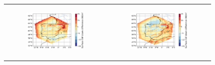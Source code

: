 \begin{figure}[htbp]
\begin{tabular}{cc}
        \begin{subfigure}[b]{0.33\textwidth}
            \caption{}
            \includegraphics[width=\textwidth]{images/chap4/forcing_source/diff_map_SWdnSFC_era_era.png}
        \end{subfigure} &
        \begin{subfigure}[b]{0.33\textwidth}
            \caption{}
            \includegraphics[width=\textwidth]{images/chap4/forcing_source/diff_map_SWdnSFC_ico_era.png}
        \end{subfigure}\\
        

\end{tabular}
\end{figure}
